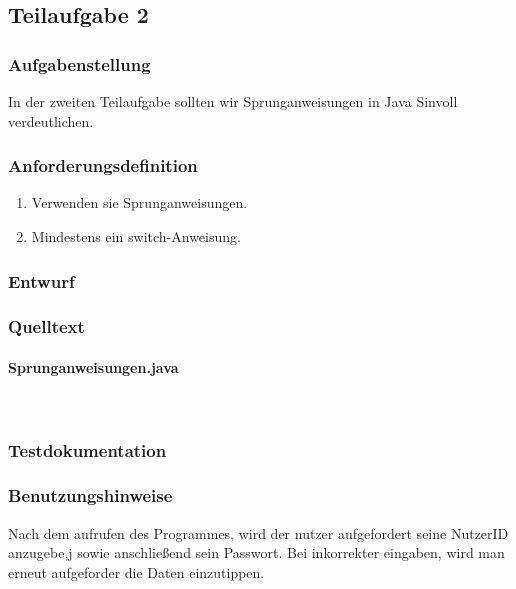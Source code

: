 \subsection{Teilaufgabe 2}
\subsubsection{Aufgabenstellung}
In der zweiten Teilaufgabe sollten wir Sprunganweisungen in Java Sinvoll verdeutlichen.

\subsubsection{Anforderungsdefinition}
\begin{enumerate}
	\item Verwenden sie Sprunganweisungen.
	\item Mindestens ein switch-Anweisung.
\end{enumerate}

\subsubsection{Entwurf}
%

\subsubsection{Quelltext}
\paragraph{Sprunganweisungen.java}\


\subsubsection{Testdokumentation}

\subsubsection{Benutzungshinweise}
Nach dem aufrufen des Programmes, wird der nutzer aufgefordert seine NutzerID anzugebe,j
sowie anschlie\ss end sein Passwort. Bei inkorrekter eingaben, wird man erneut aufgeforder
die Daten einzutippen.

